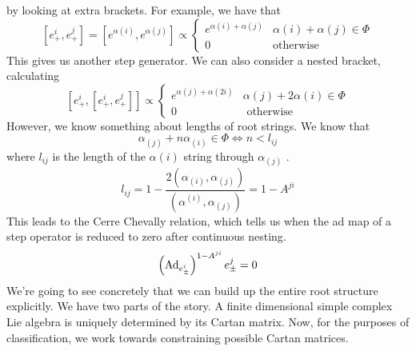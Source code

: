 by looking at extra brackets. 
For example, we have that 
\[
 \left[  e _ + ^ i , e _ + ^ j  \right]   = \left[  e ^{ \alpha ( i ) } , e ^{ \alpha \left( j  \right)  }  \right]  
 \propto \begin{cases}
	 e ^{ \alpha\left( i  \right)  + \alpha \left( j  \right)  } & \alpha ( i ) + \alpha ( j ) \in \Phi \\
	  0 & \text{otherwise}
 \end{cases}
\] This gives us another step generator. 
We can also consider a nested bracket, calculating 
\[
\left[  e_ + ^ i, \left[  e _ + ^ i , e _ + ^ j  \right]   \right]  \propto
\begin{cases}
  e ^{ \alpha ( j ) + \alpha \left(  2 i  \right)  } & \alpha ( j ) + 2 \alpha \left( i  \right)  \in \Phi \\
  0 & \text{ otherwise }
\end{cases}
\] However, we know 
something about lengths of root strings. We know that 
\[	\alpha _{ \left( j  \right)  } + n \alpha _{ \left( i  \right)  } \in \Phi  \iff n < l _{ ij} 
\] where $ l _{ ij }  $ is the length 
of the $\alpha ( i ) $ string through $ \alpha _{ \left( j  \right)  } $ . 
\[
l _{ ij }  = 1 - \frac{ 2 \left( \alpha _{ \left( i  \right)  } , \alpha _{ \left( j  \right)  }  \right)  }{ 
\left( \alpha ^{ \left(  i  \right)  } , \alpha _{ \left( j  \right)  }  \right)   }  = 1 - A ^{ ji }
\] This leads to the Cerre Chevally relation, 
which tells us when the ad map of a step 
operator is reduced to zero after continuous nesting. 
\[
\left( \text{Ad} _{ e ^ i _{ \pm } }  \right)  ^{ 1 - A ^{ ji } } e_{ \pm } ^ j  = 0   
\] 
We're going to see concretely that we can build 
up the entire root structure explicitly. 
We have two parts of the story. 
A finite dimensional simple complex 
Lie algebra is uniquely determined 
by its Cartan matrix. 
Now, for the purposes of classification, we work towards 
constraining possible Cartan matrices. 

